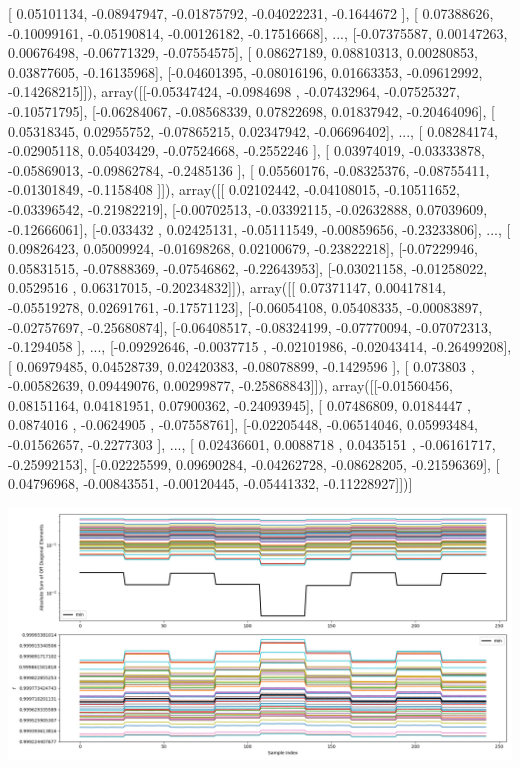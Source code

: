 \documentclass{article}
\begin{document}
       [ 0.05101134, -0.08947947, -0.01875792, -0.04022231, -0.1644672 ],
       [ 0.07388626, -0.10099161, -0.05190814, -0.00126182, -0.17516668],
       ..., 
       [-0.07375587,  0.00147263,  0.00676498, -0.06771329, -0.07554575],
       [ 0.08627189,  0.08810313,  0.00280853,  0.03877605, -0.16135968],
       [-0.04601395, -0.08016196,  0.01663353, -0.09612992, -0.14268215]]), array([[-0.05347424, -0.0984698 , -0.07432964, -0.07525327, -0.10571795],
       [-0.06284067, -0.08568339,  0.07822698,  0.01837942, -0.20464096],
       [ 0.05318345,  0.02955752, -0.07865215,  0.02347942, -0.06696402],
       ..., 
       [ 0.08284174, -0.02905118,  0.05403429, -0.07524668, -0.2552246 ],
       [ 0.03974019, -0.03333878, -0.05869013, -0.09862784, -0.2485136 ],
       [ 0.05560176, -0.08325376, -0.08755411, -0.01301849, -0.1158408 ]]), array([[ 0.02102442, -0.04108015, -0.10511652, -0.03396542, -0.21982219],
       [-0.00702513, -0.03392115, -0.02632888,  0.07039609, -0.12666061],
       [-0.033432  ,  0.02425131, -0.05111549, -0.00859656, -0.23233806],
       ..., 
       [ 0.09826423,  0.05009924, -0.01698268,  0.02100679, -0.23822218],
       [-0.07229946,  0.05831515, -0.07888369, -0.07546862, -0.22643953],
       [-0.03021158, -0.01258022,  0.0529516 ,  0.06317015, -0.20234832]]), array([[ 0.07371147,  0.00417814, -0.05519278,  0.02691761, -0.17571123],
       [-0.06054108,  0.05408335, -0.00083897, -0.02757697, -0.25680874],
       [-0.06408517, -0.08324199, -0.07770094, -0.07072313, -0.1294058 ],
       ..., 
       [-0.09292646, -0.0037715 , -0.02101986, -0.02043414, -0.26499208],
       [ 0.06979485,  0.04528739,  0.02420383, -0.08078899, -0.1429596 ],
       [ 0.073803  , -0.00582639,  0.09449076,  0.00299877, -0.25868843]]), array([[-0.01560456,  0.08151164,  0.04181951,  0.07900362, -0.24093945],
       [ 0.07486809,  0.0184447 ,  0.0874016 , -0.0624905 , -0.07558761],
       [-0.02205448, -0.06514046,  0.05993484, -0.01562657, -0.2277303 ],
       ..., 
       [ 0.02436601,  0.0088718 ,  0.0435151 , -0.06161717, -0.25992153],
       [-0.02225599,  0.09690284, -0.04262728, -0.08628205, -0.21596369],
       [ 0.04796968, -0.00843551, -0.00120445, -0.05441332, -0.11228927]])]
\begin{center}
\includegraphics[scale=.9]{report_pickled_controls254/control_dpn_all.png}

\end{center}
\end{document}
